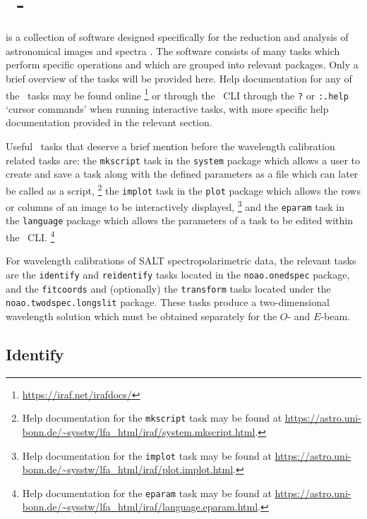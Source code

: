 \section[\textsc{iraf}]{\iraf\ - } \label{sec:iraf}

 is a collection of software designed specifically for the reduction and analysis of astronomical images and spectra \citep{iraf:1986, iraf:1993}. The software consists of many tasks which perform specific operations and which are grouped into relevant packages. Only a brief overview of the tasks will be provided here. Help documentation for any of the \iraf\ tasks may be found online%
\footnote{\url{https://iraf.net/irafdocs/}}
or through the \iraf\ \gls{CLI} through the \texttt{?} or \texttt{:.help} `cursor commands' when running interactive tasks, with more specific help documentation provided in the relevant section.

Useful \iraf\ tasks that deserve a brief mention before the wavelength calibration related tasks are: the \texttt{mkscript} task in the \texttt{system} package which allows a user to create and save a task along with the defined parameters as a file which can later be called as a script,%
\footnote{Help documentation for the \texttt{mkscript} task may be found at \url{https://astro.uni-bonn.de/~sysstw/lfa_html/iraf/system.mkscript.html}.}
the \texttt{implot} task in the \texttt{plot} package which allows the rows or columns of an image to be interactively displayed,%
\footnote{Help documentation for the \texttt{implot} task may be found at \url{https://astro.uni-bonn.de/~sysstw/lfa_html/iraf/plot.implot.html}.}
and the \texttt{eparam} task in the \texttt{language} package which allows the parameters of a task to be edited within the \iraf\ \gls{CLI}.%
\footnote{Help documentation for the \texttt{eparam} task may be found at \url{https://astro.uni-bonn.de/~sysstw/lfa_html/iraf/language.eparam.html}.}

For wavelength calibrations of \gls{SALT} spectropolarimetric data, the relevant tasks are the \texttt{identify} and \texttt{reidentify} tasks located in the \texttt{noao.onedspec} package, and the \texttt{fitcoords} and (optionally) the \texttt{transform} tasks located under the \texttt{noao.twodspec.long\-slit} package. These tasks produce a two-dimensional wavelength solution which must be obtained separately for the $O$- and $E$-beam.

\subsection{Identify}

